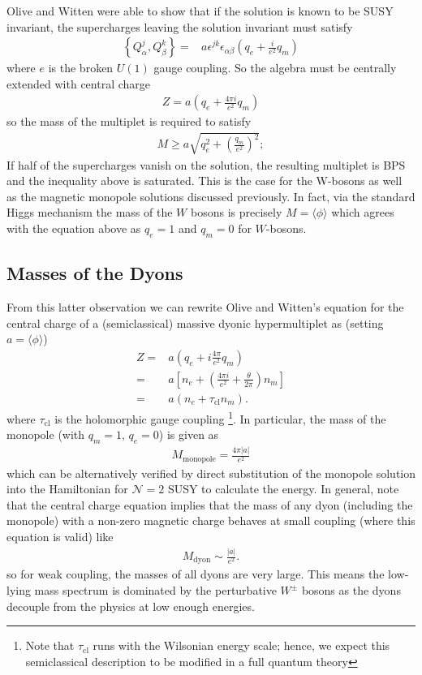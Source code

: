 \documentclass[12pt, onecolumn]{article}
\begin{document}
Olive and Witten were able to show that if the solution is known to be SUSY invariant, the supercharges leaving the solution invariant must satisfy
\begin{align*}
\left \{Q_{\alpha}^{j},Q_{\beta}^{k}\right \}=&a\epsilon^{jk}\epsilon_{\alpha \beta} \left(q_{e}+\frac{i}{e^2}q_{m}\right)
\end{align*}
where $e$ is the broken $U(1)$ gauge coupling.  So the algebra must be centrally extended with central charge
\begin{align*}
Z=a \left(q_{e}+\frac{4\pi i}{e^2}q_{m}\right)
\end{align*}
so the mass of the multiplet is required to satisfy
\begin{align*}
M \geq a \sqrt{q_{e}^2+\left(\frac{q_{m}}{e^2}\right)^2};
\end{align*}
If half of the supercharges vanish on the solution, the resulting multiplet is BPS and the inequality above is saturated.  This is the case for the W-bosons as well as the magnetic monopole solutions discussed previously.  In fact, via the standard Higgs mechanism the mass of the $W$ bosons is precisely $M=\langle \phi \rangle$ which agrees with the equation above as $q_{e}=1$ and $q_{m}=0$ for $W$-bosons.

\subsection{Masses of the Dyons}

\noindent From this latter observation we can rewrite Olive and Witten's equation for the central charge of a (semiclassical) massive dyonic hypermultiplet as (setting $a=\langle \phi \rangle$)
\begin{align}
Z=&a \left(q_{e}+i\frac{4\pi}{e^2}q_{m}\right) \nonumber\\
=&a \left[n_{e}+\left(\frac{4\pi i}{e^2}+\frac{\theta}{2\pi}\right)n_{m}\right] \nonumber\\
=&a \left(n_{e}+\tau_{\text{cl}}n_{m}\right).
\label{eqn_OWcentral}
\end{align}
where $\tau_{\text{cl}}$ is the holomorphic gauge coupling \footnote{Note that $\tau_{\text{cl}}$ runs with the Wilsonian energy scale; hence, we expect this semiclassical description to be modified in a full quantum theory}.  In particular, the mass of the monopole (with $q_{m}=1,\,q_{e}=0$) is given as
\begin{align*}
M_{\text{monopole}}=\frac{4\pi|a|}{e^2}
\end{align*}
which can be alternatively verified by direct substitution of the monopole solution into the Hamiltonian for $\mathcal{N}=2$ SUSY to calculate the energy.  In general, note that the central charge equation implies that the mass of any dyon (including the monopole) with a non-zero magnetic charge behaves at small coupling (where this equation is valid) like
\begin{align*}
M_{\text{dyon}} \sim \frac{|a|}{e^2}.
\end{align*}
so for weak coupling, the masses of all dyons are very large.  This means the low-lying mass spectrum is dominated by the perturbative $W^{\pm}$ bosons as the dyons decouple from the physics at low enough energies.
\end{document}
